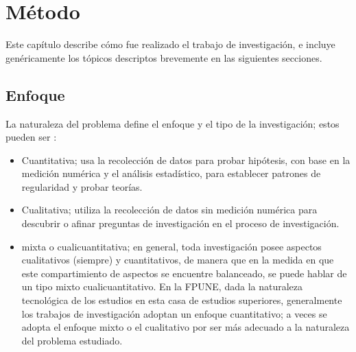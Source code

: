 \fancyhead{}
\fancyfoot{}
\cfoot{\thepage}



\chapter{Método}

Este capítulo describe cómo fue realizado el trabajo de investigación, e incluye genéricamente los tópicos descriptos brevemente en las siguientes secciones.

\section{Enfoque}
La naturaleza del problema define el enfoque y el tipo de la investigación; estos pueden ser \cite{sampieri}:
\begin{itemize}
\item Cuantitativa; usa la recolección de datos para probar hipótesis, con base en la medición numérica y el análisis estadístico, para establecer patrones de regularidad y probar teorías. 
\item Cualitativa; utiliza la recolección de datos sin medición numérica para descubrir o afinar preguntas de investigación en el proceso de investigación.
\item mixta o cualicuantitativa; en general, toda investigación posee aspectos cualitativos (siempre) y cuantitativos, de manera que en la medida en que este compartimiento de aspectos se encuentre balanceado, se puede hablar de un tipo mixto cualicuantitativo.
En la FPUNE, dada la naturaleza tecnológica de los estudios en esta casa de estudios superiores, generalmente los trabajos de investigación adoptan un enfoque cuantitativo; a veces se adopta el enfoque mixto o el cualitativo por ser más adecuado a la naturaleza del problema estudiado.
\end{itemize}

